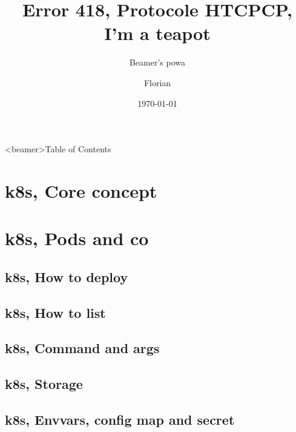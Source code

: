 \documentclass[8pt]{beamer}
\title{Error 418, Protocole HTCPCP, I'm a teapot}
\subtitle{Beamer's powa}
\author{Florian}
\institute{Tourism's institute of nowhere}
\date{\today}
\begin{document}
\begin{frame}
\titlepage{}
\end{frame}

\begin{frame}<beamer>{Table of Contents}
  \setcounter{tocdepth}{2}
  \tableofcontents[]
\end{frame}

\section{k8s, Core concept}




\section{k8s, Pods and co}
\subsection{k8s, How to deploy}







\subsection{k8s, How to list}




\subsection{k8s, Command and args}



\subsection{k8s, Storage}



\subsection{k8s, Envvars, config map and secret}
\end{document}
